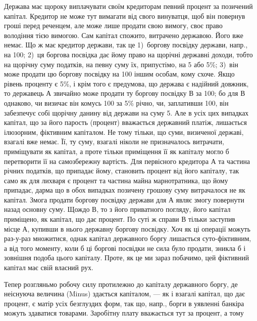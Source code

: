 Держава має щороку виплачувати своїм кредиторам певний процент за
позичений капітал. Кредитор не може тут вимагати від свого винуватця, щоб він
повернув гроші перед реченцем, але може лише продати свою вимогу, своє
право володіння тією вимогою. Сам капітал спожито, витрачено державою. Його
вже немає. Що ж має кредитор держави, так це 1)~боргову посвідку держави,
напр., на 100; 2)~ця боргова посвідка дає йому право на щорічні
державні доходи, тобто на щорічну суму податків, на певну суму їх, припустімо,
на 5 або 5\%; 3)~він може продати цю боргову посвідку на 100
іншим особам, кому схоче. Якщо рівень проценту є 5\%, і крім того є предумова,
що держава є надійний довжник, то державець $А$ звичайно може продати ту боргову
посвідку $В$ за 100; бо для $В$ однаково, чи визичає він комусь 100
за 5\% річно, чи, заплативши 100, він забезпечує собі щорічну данину
від держави на суму 5. Але в усіх цих випадках капітал, що за його
парость (процент) вважається державний платіж, лишається ілюзорним, фіктивним
капіталом. Не тому тільки, що суми, визиченої державі, взагалі вже немає.
Її, ту суму, взагалі ніколи не призначалось витрачати, приміщувати як капітал,
а проте тільки приміщення її як капіталу могло б перетворити її на самозбережну
вартість. Для первісного кредитора $А$ та частина річних податків, що припадає
йому, становить процент від його капіталу, так само як для лихваря є процент
та частина майна марнотратника, що йому припадає, дарма що в обох випадках
позичену грошову суму витрачалося не як капітал. Змога продати боргову
посвідку держави для $А$ являє змогу повернути назад основну суму. Щождо $В$,
то з його приватного погляду, його капітал приміщено, як капітал, що дає
процент. По суті ж справи $В$ тільки заступив місце $А$, купивши в нього
державну боргову посвідку. Хоч як ці операції можуть раз-у-раз множитися,
однак капітал державного боргу лишається суто-фіктивним, а від того моменту,
коли б ці боргові посвідки не сила було продати, зникла б і зовнішня подоба
цього капіталу. Проте, як це ми зараз побачимо, цей фіктивний капітал
має свій власний рух.

Тепер розгляньмо робочу силу протилежно до капіталу державного боргу,
де неіснуюча величина (Minus) здається капіталом, — як і взагалі капітал, що дає
процент, є матір усіх безглуздих форм, так що, напр., борги в уявленні банкіра
можуть здаватися товарами. Заробітну плату вважається тут за процент, а тому
\parbreak{}  %
